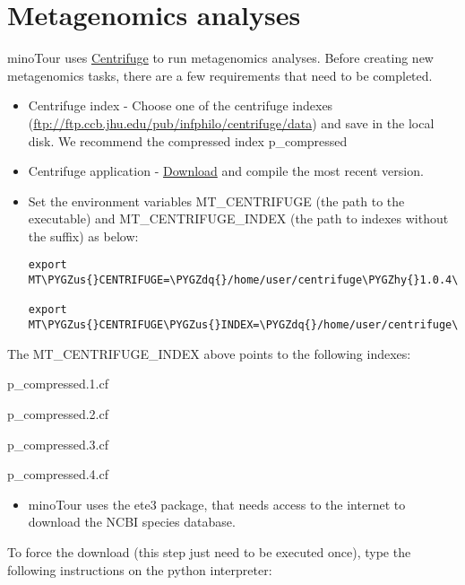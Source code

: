 \documentclass[letterpaper,10pt,english]{sphinxmanual}
\def\PYGZus{\char`\_}
\def\PYGZhy{\char`\-}
\def\PYGZdq{\char`\"}
\begin{document}
\section{Metagenomics analyses}
\label{development:metagenomics-analyses}
minoTour uses \href{https://ccb.jhu.edu/software/centrifuge/}{Centrifuge} to run metagenomics analyses.
Before creating new metagenomics tasks, there are a few requirements that need to be completed.
\begin{itemize}
\item {} 
Centrifuge index - Choose one of the centrifuge indexes (\href{ftp://ftp.ccb.jhu.edu/pub/infphilo/centrifuge/data}{ftp://ftp.ccb.jhu.edu/pub/infphilo/centrifuge/data}) and save in the local disk. We recommend the compressed index p\_compressed

\item {} 
Centrifuge application - \href{https://github.com/infphilo/centrifuge/releases}{Download} and compile the most recent version.

\item {} 
Set the environment variables MT\_CENTRIFUGE (the path to the executable) and MT\_CENTRIFUGE\_INDEX (the path to indexes without the suffix) as below:

\begin{Verbatim}[commandchars=\\\{\}]
export MT\PYGZus{}CENTRIFUGE=\PYGZdq{}/home/user/centrifuge\PYGZhy{}1.0.4\PYGZhy{}beta/centrifuge\PYGZdq{}

export MT\PYGZus{}CENTRIFUGE\PYGZus{}INDEX=\PYGZdq{}/home/user/centrifuge\PYGZus{}indexes/p\PYGZus{}compressed\PYGZdq{}
\end{Verbatim}

\end{itemize}

The MT\_CENTRIFUGE\_INDEX above points to the following indexes:

p\_compressed.1.cf

p\_compressed.2.cf

p\_compressed.3.cf

p\_compressed.4.cf
\begin{itemize}
\item {} 
minoTour uses the ete3 package, that needs access to the internet to download the NCBI species database.

\end{itemize}

To force the download (this step just need to be executed once), type the following instructions on the python interpreter:
\end{document}
